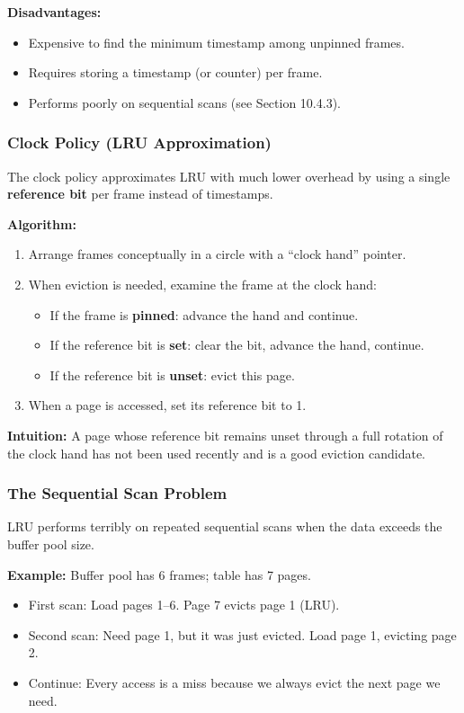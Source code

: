\textbf{Disadvantages:}
\begin{itemize}
    \item Expensive to find the minimum timestamp among unpinned frames.
    \item Requires storing a timestamp (or counter) per frame.
    \item Performs poorly on sequential scans (see Section 10.4.3).
\end{itemize}

\subsubsection*{Clock Policy (LRU Approximation)}

The clock policy approximates LRU with much lower overhead by using a single \textbf{reference bit} per frame instead of timestamps.

\textbf{Algorithm:}
\begin{enumerate}
    \item Arrange frames conceptually in a circle with a ``clock hand'' pointer.
    \item When eviction is needed, examine the frame at the clock hand:
    \begin{itemize}
        \item If the frame is \textbf{pinned}: advance the hand and continue.
        \item If the reference bit is \textbf{set}: clear the bit, advance the hand, continue.
        \item If the reference bit is \textbf{unset}: evict this page.
    \end{itemize}
    \item When a page is accessed, set its reference bit to 1.
\end{enumerate}

\textbf{Intuition:} A page whose reference bit remains unset through a full rotation of the clock hand has not been used recently and is a good eviction candidate.

\subsubsection*{The Sequential Scan Problem}

LRU performs terribly on repeated sequential scans when the data exceeds the buffer pool size.

\textbf{Example:} Buffer pool has 6 frames; table has 7 pages.
\begin{itemize}
    \item First scan: Load pages 1--6. Page 7 evicts page 1 (LRU).
    \item Second scan: Need page 1, but it was just evicted. Load page 1, evicting page 2.
    \item Continue: Every access is a miss because we always evict the next page we need.
\end{itemize}

